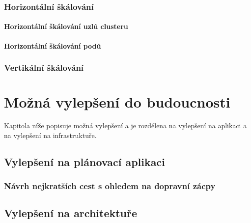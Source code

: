 \documentclass[thesis=M,czech]{FITthesis}[2019/12/23]
\theoremstyle{plain}
\theoremstyle{definition}
\begin{document}

\subsection{Horizontální škálování}
\subsubsection{Horizontální škálování uzlů clusteru}
\subsubsection{Horizontální škálování podů}

\subsection{Vertikální škálování}



\chapter{Možná vylepšení do budoucnosti}
Kapitola níže popisuje možná vylepšení a je rozdělena na vylepšení na aplikaci a na vylepšení na infrastruktuře.

\section{Vylepšení na plánovací aplikaci}

\subsection{Návrh nejkratších cest s ohledem na dopravní zácpy}




\section{Vylepšení na architektuře}
\end{document}
